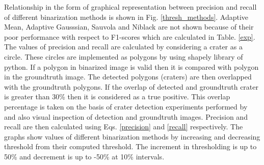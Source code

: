 \documentclass[11pt]{article}
\begin{document}
Relationship in the form of graphical representation between precision and recall of different binarization methods is shown in Fig. \ref{thresh_methods}. Adaptive Mean, Adaptive Gausssian, Sauvola and Niblack are not shown because of their poor performance with respect to F1-scores which are calculated in Table. \ref{exp}. The values of precision and recall are calculated by considering a crater as a circle. These circles are implemented as polygons by using shapely library of python. If a polygon in binarized image is valid then it is compared with polygon in the groundtruth image. The detected polygons (craters) are then overlapped with the groundtruth polygons. If the overlap of detected and groundtruth crater is greater than 30\% then it is considered as a true positive. This overlap percentage is taken on the basis of crater detection experiments performed by \cite{emami2015automatic} and also visual inspection of detection and groundtruth images. Precision and recall are then calculated using Eqs. \ref{precision} and \ref{recall} respectively. The graphs show values of different binarization methods by increasing and decreasing threshold from their computed threshold. The increment in thresholding is up to 50\% and decrement is up to -50\% at 10\% intervals.
\end{document}
